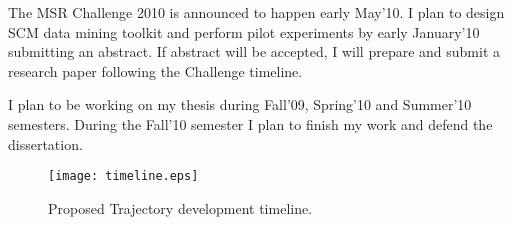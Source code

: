 The MSR Challenge 2010 is announced to happen early May'10. I plan to design SCM data mining toolkit and perform pilot experiments by early January'10 submitting an abstract. If abstract will be accepted, I will prepare and submit a research paper following the Challenge timeline.

I plan to be working on my thesis during Fall'09, Spring'10 and Summer'10 semesters. During the Fall'10 semester I plan to finish my work and defend the dissertation.

\begin{figure}[tbp]
   \centering
   \texttt{[image: timeline.eps]}
   \caption{Proposed Trajectory development timeline.}
   \label{fig:timeline}
\end{figure}